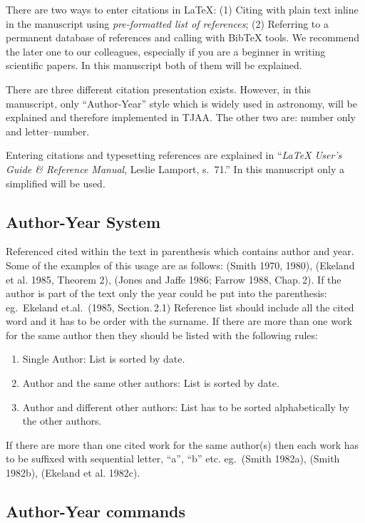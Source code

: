 \documentclass[usenatbib]{tjaa}
\begin{document}
There are two ways to enter citations in \LaTeX{}:
(1) Citing with plain text inline in the manuscript using
\textit{pre-formatted list of references};
(2) Referring to a permanent database of references and calling with BibTeX
tools.
We recommend the later one to our colleagues, especially if you are a beginner
in writing scientific papers.
In this manuscript both of them will be explained.

There are three different citation presentation exists.
However, in this manuscript, only ``Author-Year'' style which is widely
used in astronomy, will be explained and therefore implemented in TJAA.
The other two are: number only and letter--number.

Entering citations and typesetting references are explained in
``{\em \LaTeX{} User's Guide \& Reference Manual\/}, Leslie Lamport, s.~71.''
In this manuscript only a simplified will be used.

\newpage
\subsection{Author-Year System}

Referenced cited within the text in parenthesis which contains author and
year.
Some of the examples of this usage are as follows:
(Smith 1970, 1980), (Ekeland et al. 1985, Theorem 2), (Jones and Jaffe
1986; Farrow 1988, Chap.\,2).
If the author is part of the text only the year could be put into the
parenthesis:
eg.\ Ekeland et.al.\ (1985, Section.\,2.1)
Reference list should include all the cited word and it has to be order with
the surname.
If there are more than one work for the same author then they should be listed
with the following rules:
\begin{enumerate}
\setlength{\hfuzz}{5pt}
\item
Single Author: List is sorted by date.
\item
Author and the same other authors: List is sorted by date.
\item
Author and different other authors: List has to be sorted alphabetically by
the other authors.
\end{enumerate}
If there are more than one cited work for the same author(s) then each work
has to be suffixed with sequential letter, ``a'', ``b'' etc.
eg.\ (Smith 1982a), (Smith 1982b), (Ekeland et al. 1982c).

\subsection{Author-Year commands}
\end{document}

